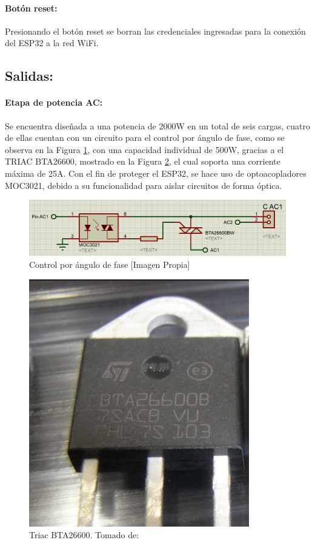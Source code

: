 	\paragraph{Botón reset:}
		Presionando el botón reset se borran las credenciales ingresadas para la conexión del ESP32 a la red WiFi.\\
		
	\subsection{Salidas:}
	\paragraph{Etapa de potencia AC:}
		Se encuentra diseñada a una potencia de 2000W en un total de seis cargas, cuatro de ellas cuentan con un circuito para el control por ángulo de fase, como se observa en la Figura \ref{fig:CAC1}, con una capacidad individual de 500W, gracias a el TRIAC BTA26600, mostrado en la Figura \ref{fig:TRIAC}, el cual soporta una corriente máxima de 25A. Con el fin de proteger el ESP32, se hace uso de optoacopladores MOC3021, debido a su funcionalidad para aislar circuitos de forma óptica.\\
		
		\begin{figure}[H]
			\centering
			\caption{Control por ángulo de fase [Imagen Propia]}
			\label{fig:CAC1}
			\includegraphics[width=0.8\linewidth]{Imagenes/CAC1}
		\end{figure}
	
		\begin{figure}[H]
			\centering
			\caption{Triac BTA26600. Tomado de: \cite{TRIAC}}
			\label{fig:TRIAC}
			\includegraphics[width=0.35\linewidth]{Imagenes/TRIAC}
		\end{figure}
	
